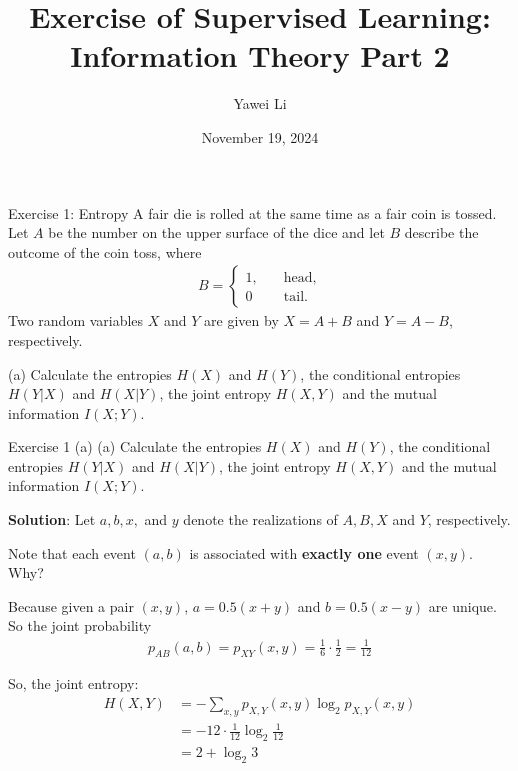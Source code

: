 \documentclass[aspectratio=169]{beamer}
\title[]{\textbf{Exercise of Supervised Learning:\\Information Theory Part 2}}
\author{Yawei Li}
\institute[LMU]
{
\\
  \texttt{yawei.li@stat.uni-muenchen.de}
}
\date{November 19, 2024}
\begin{document}
\begin{frame}
\titlepage

\end{frame}

\begin{frame}{Exercise 1: Entropy}
	A fair die is rolled at the same time as a fair coin is tossed. Let $A$ be the number on the upper surface of the dice and let $B$ describe the outcome of the coin toss, where 
	\begin{align*}
		B = \begin{cases}
			1, \quad & \text{head,} \\
			0 \quad & \text{tail.}
		\end{cases}
	\end{align*}
	Two random variables $X$ and $Y$ are given by $X = A + B$ and $Y = A - B$, respectively.
	\vspace{10pt}
	
	(a) Calculate the entropies $H(X)$ and $H(Y)$, the conditional entropies $H(Y|X)$ and $H(X|Y)$, the joint entropy $H(X, Y)$ and the mutual information $I(X;Y)$.
\end{frame}

\begin{frame}{Exercise 1 (a)}
(a) Calculate the entropies $H(X)$ and $H(Y)$, the conditional entropies $H(Y|X)$ and $H(X|Y)$, the joint entropy $H(X, Y)$ and the mutual information $I(X;Y)$.

\textbf{Solution}: Let $a, b, x,$ and $y$ denote the realizations of $A, B, X$ and $Y$, respectively.

Note that each event $(a,b)$ is associated with \textbf{exactly one} event $(x,y)$. Why?

Because given a pair $(x, y)$, $a = 0.5 (x + y)$ and $b = 0.5 (x - y)$ are unique. 
So the joint probability
\begin{align*}
	p_{AB}(a, b) = p_{XY}(x, y) = \frac{1}{6} \cdot \frac{1}{2} = \frac{1}{12}
\end{align*}

So, the joint entropy:
\begin{align*}
	H(X, Y) &= - \sum_{x, y} p_{X, Y}(x,y) \log_2 p_{X, Y}(x, y) \\ 
	&= - 12 \cdot \frac{1}{12} \log_2 \frac{1}{12} \\ 
	&= 2 + \log_2 3
\end{align*}
	
\end{frame}
\end{document}

